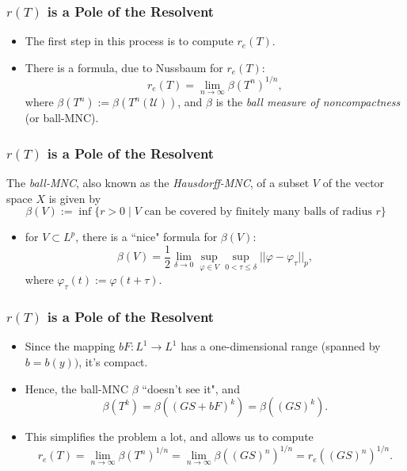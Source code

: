 \documentclass{beamer}
\newcommand{\dd}{{\delta}}
\begin{document}
\begin{frame}
	\frametitle{$r(T)$ is a Pole of the Resolvent}
	\begin{itemize}
		\item The first step in this process is to compute $r_e(T)$.
		\pause
		\item There is a formula, due to Nussbaum \cite{Nussbaum1970} for $r_e(T)$:
		\[r_e(T) = \lim_{n \to \infty} \beta(T^n)^{1/n},\]
		\pause
		where $\beta(T^n) := \beta(T^n(\mathscr{U}))$, and $\beta$ is the \emph{ball measure of noncompactness} (or ball-MNC).
	\end{itemize}
\end{frame}

\begin{frame}
	\frametitle{$r(T)$ is a Pole of the Resolvent}
	\begin{definition}
		The \emph{ball-MNC}, also known as the \emph{Hausdorff-MNC}, of a subset $V$ of the vector space $X$ is given by
		\[\beta(V) := \inf\{r > 0 \mid V \text{ can be covered by finitely many balls of radius } r\}\]
	\end{definition}
	\pause
	\begin{itemize}
		\item for $V \subset L^p$, there is a ``nice" formula for $\beta(V)$:
			\[\beta(V) = \frac 12 \lim_{\dd \to 0} \sup_{\varphi \in V} \sup_{0 < \tau \leq \dd} ||\varphi - \varphi_\tau||_p,\]
			where $\varphi_\tau(t) := \varphi(t+\tau)$.
	\end{itemize}
\end{frame}

\begin{frame}
	\frametitle{$r(T)$ is a Pole of the Resolvent}
	\begin{itemize}
		\item Since the mapping $bF:L^1 \to L^1$ has a one-dimensional range (spanned by $b = b(y))$,  it's compact.
		\pause
		\item Hence, the ball-MNC $\beta$ ``doesn't see it", and
		\[\beta(T^k) = \beta((GS + bF)^k) = \beta((GS)^k).\] 
		\vspace*{-\baselineskip}
		\pause
		\item This simplifies the problem a lot, and allows us to compute
		\[r_e(T) = \lim_{n \to \infty} \beta(T^n)^{1/n} = \lim_{n \to \infty} \beta((GS)^n)^{1/n} = r_e((GS)^n)^{1/n}.\]
	\end{itemize}
\end{frame}
\end{document}
